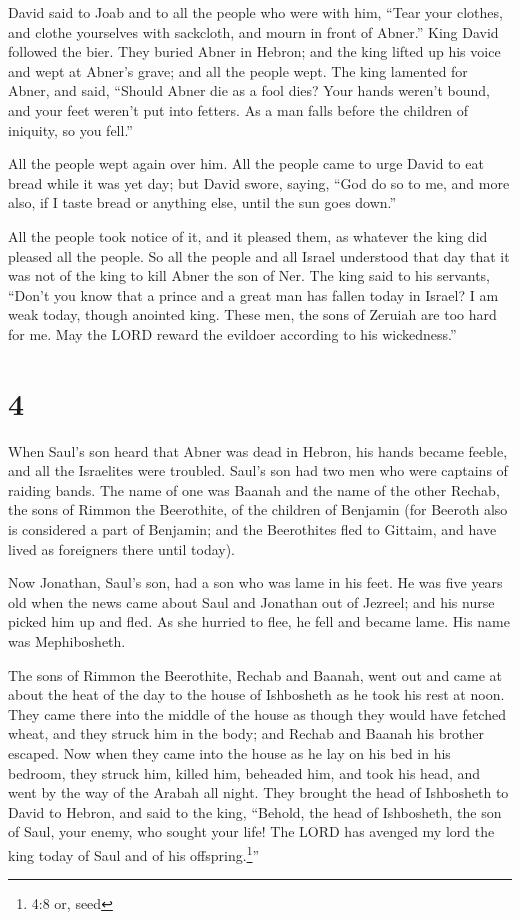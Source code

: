  David said to Joab and to all the people who were with
him, ``Tear your clothes, and clothe yourselves with sackcloth, and
mourn in front of Abner.'' King David followed the bier. 
They buried Abner in Hebron; and the king lifted up his voice and wept
at Abner's grave; and all the people wept.  The king
lamented for Abner, and said, ``Should Abner die as a fool dies?
 Your hands weren't bound, and your feet weren't put into
fetters. As a man falls before the children of iniquity, so you fell.''

All the people wept again over him.  All the people came to
urge David to eat bread while it was yet day; but David swore, saying,
``God do so to me, and more also, if I taste bread or anything else,
until the sun goes down.''

 All the people took notice of it, and it pleased them, as
whatever the king did pleased all the people.  So all the
people and all Israel understood that day that it was not of the king to
kill Abner the son of Ner.  The king said to his servants,
``Don't you know that a prince and a great man has fallen today in
Israel?  I am weak today, though anointed king. These men,
the sons of Zeruiah are too hard for me. May the LORD reward the
evildoer according to his wickedness.''

\hypertarget{section-3}{%
\section{4}\label{section-3}}

 When Saul's son heard that Abner was dead in Hebron, his
hands became feeble, and all the Israelites were troubled. 
Saul's son had two men who were captains of raiding bands. The name of
one was Baanah and the name of the other Rechab, the sons of Rimmon the
Beerothite, of the children of Benjamin (for Beeroth also is considered
a part of Benjamin;  and the Beerothites fled to Gittaim,
and have lived as foreigners there until today).

 Now Jonathan, Saul's son, had a son who was lame in his
feet. He was five years old when the news came about Saul and Jonathan
out of Jezreel; and his nurse picked him up and fled. As she hurried to
flee, he fell and became lame. His name was Mephibosheth.

 The sons of Rimmon the Beerothite, Rechab and Baanah, went
out and came at about the heat of the day to the house of Ishbosheth as
he took his rest at noon.  They came there into the middle
of the house as though they would have fetched wheat, and they struck
him in the body; and Rechab and Baanah his brother escaped. 
Now when they came into the house as he lay on his bed in his bedroom,
they struck him, killed him, beheaded him, and took his head, and went
by the way of the Arabah all night.  They brought the head
of Ishbosheth to David to Hebron, and said to the king, ``Behold, the
head of Ishbosheth, the son of Saul, your enemy, who sought your life!
The LORD has avenged my lord the king today of Saul and of his
offspring.\footnote{4:8 or, seed}''

